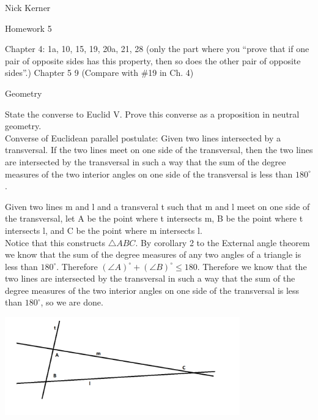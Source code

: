 \documentclass[12pt,letterpaper]{article}
\newcommand{\Proof}{\noindent {\bf Proof: }}
\newcommand{\pro}[1]{\noindent {\bf #1}}
\begin{document}
\begin{flushright}
Nick Kerner

Homework 5

Chapter 4: 1a, 10, 15, 19, 20a, 21, 28 (only the part where you ``prove that if one pair of opposite
sides has this property, then so does the other pair of opposite sides''.)
Chapter 5
9 (Compare with \#19 in Ch. 4)

\end{flushright}
\begin{center}
\large{Geometry}\\
\end{center}

\pro{1a} State the converse to Euclid V.  Prove this converse as a proposition in neutral geometry.\\

Converse of Euclidean parallel postulate: Given two lines intersected by a transversal.  If the two lines meet on one side of the transversal, then the two lines are intersected by the transversal in such a way that the sum of the degree measures of the two interior angles on one side of the transversal is less than $180^\circ$.\\


\Proof

Given two lines m and l and a transveral t such that m and l meet on one side of the transversal, let A be the point where t intersects m, B be the point where t intersects l, and C be the point where m intersects l. \\

Notice that this constructs $\triangle ABC$.  By corollary 2 to the External angle theorem we know that the sum of the degree measures of any two angles of a triangle is less than $180^\circ$.  Therefore $(\angle A)^\circ + (\angle B)^\circ \leq 180$.  Therefore we know that the two lines are intersected by the transversal in such a way that the sum of the degree measures of the two interior angles on one side of the transversal is less than $180^\circ$, so we are done.

\begin{center}
\includegraphics[width=4in]{hw5_prob1.png}
\end{center}
\end{document}
